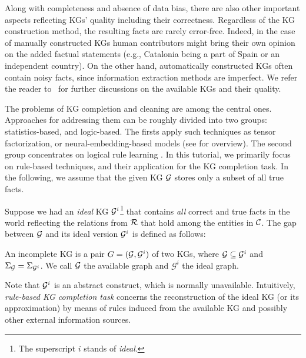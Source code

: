 Along with completeness and absence of data bias, there are also other important aspects reflecting KGs' quality %
including %
their correctness. Regardless of the KG construction method, the resulting facts are rarely error-free. Indeed, in the case of manually constructed KGs human contributors might bring their own opinion on the added factual statements (e.g., Catalonia being a part of Spain or an independent country). On the other hand, automatically constructed KGs often contain noisy facts, since information extraction methods are imperfect. We refer the reader to~\cite{Nickel2015ARO,DBLP:journals/semweb/Paulheim17} for further discussions on the available KGs and their quality.



The problems of KG completion and cleaning are %
among the central ones. Approaches for addressing them can be roughly divided into two groups: statistics-based, and logic-based. The firsts apply such techniques as tensor factorization, or neural-embedding-based models (see \cite{DBLP:journals/pieee/Nickel0TG16} for overview). The second group concentrates on logical rule learning \cite{ruleoverview}. In this tutorial, we primarily focus on rule-based techniques, and their application for the KG completion task. In the following, we assume that the given KG $\mathcal{G}$ stores only a subset of all true facts.

Suppose we had an \emph{ideal} KG $\mathcal{G}^i$\footnote{The superscript $i$ stands of \emph{ideal}.} that contains \emph{all} correct and true facts in the world reflecting the relations from $\mathcal{R}$ that hold among the entities in $\mathcal{C}$. The gap between $\mathcal{G}$ and its ideal version $\mathcal{G}^i$ is defined as follows: 

\begin{definition} An incomplete KG is a pair
    $G = (\mathcal{G}, \mathcal{G}^i)$ of two KGs, where $\mathcal{G}\subseteq \mathcal{G}^i$ and
    $\Sigma_{\mathcal{G}}=\Sigma_{\mathcal{G}^i}$. We call $\mathcal{G}$ the available
    graph and $\mathcal{G}^i$ the ideal graph.
\end{definition}
    
Note that $\mathcal{G}^i$ is an abstract construct, which is normally unavailable. Intuitively, \emph{rule-based KG completion task} concerns the reconstruction of the ideal KG (or its approximation) by means of rules induced from the available KG and possibly other external information sources.

